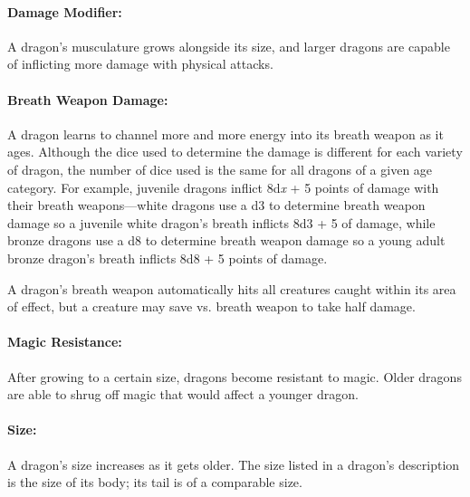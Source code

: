 \begin{multicols}{2}
\paragraph{Damage Modifier:} A dragon's musculature grows alongside its size, and larger dragons are capable of inflicting more damage with physical attacks.

\paragraph{Breath Weapon Damage:} A dragon learns to channel more and more energy into its breath weapon as it ages. Although the  dice used to determine the damage is different for each variety of dragon, the number of dice used is the same for all dragons of a given age category. For example, juvenile dragons inflict 8d\textit{x} + 5 points of damage with their breath weapons---white dragons use a d3 to determine breath weapon damage so a juvenile white dragon's breath inflicts 8d3 + 5 of damage, while bronze dragons use a d8 to determine breath weapon damage so a young adult bronze dragon's breath inflicts 8d8 + 5 points of damage.

A dragon's breath weapon automatically hits all creatures caught within its area of effect, but a creature may save vs. breath weapon to take half damage.

\paragraph{Magic Resistance:} After growing to a certain size, dragons become resistant to magic. Older dragons are able to shrug off magic that would affect a younger dragon.

\paragraph{Size:} A dragon's size increases as it gets older. The size listed in a dragon's description is the size of its body; its tail is of a comparable size.

\end{multicols}

